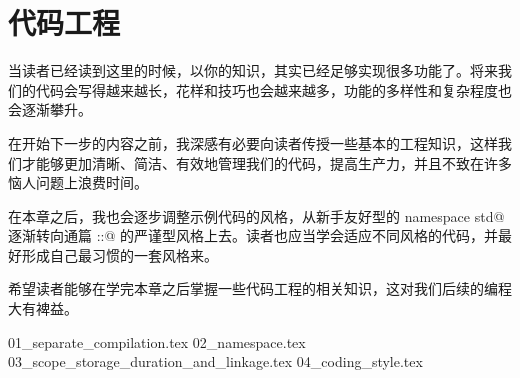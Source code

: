 \chapter{代码工程}
当读者已经读到这里的时候，以你的知识，其实已经足够实现很多功能了。将来我们的代码会写得越来越长，花样和技巧也会越来越多，功能的多样性和复杂程度也会逐渐攀升。\par
在开始下一步的内容之前，我深感有必要向读者传授一些基本的工程知识，这样我们才能够更加清晰、简洁、有效地管理我们的代码，提高生产力，并且不致在许多恼人问题上浪费时间。\par
在本章之后，我也会逐步调整示例代码的风格，从新手友好型的 \lstinline@using namespace std@ 逐渐转向通篇 \lstinline@std::@ 的严谨型风格上去。读者也应当学会适应不同风格的代码，并最好形成自己最习惯的一套风格来。\par
希望读者能够在学完本章之后掌握一些代码工程的相关知识，这对我们后续的编程大有裨益。\par
{01_separate_compilation.tex}
{02_namespace.tex}
{03_scope_storage_duration_and_linkage.tex}
{04_coding_style.tex}
